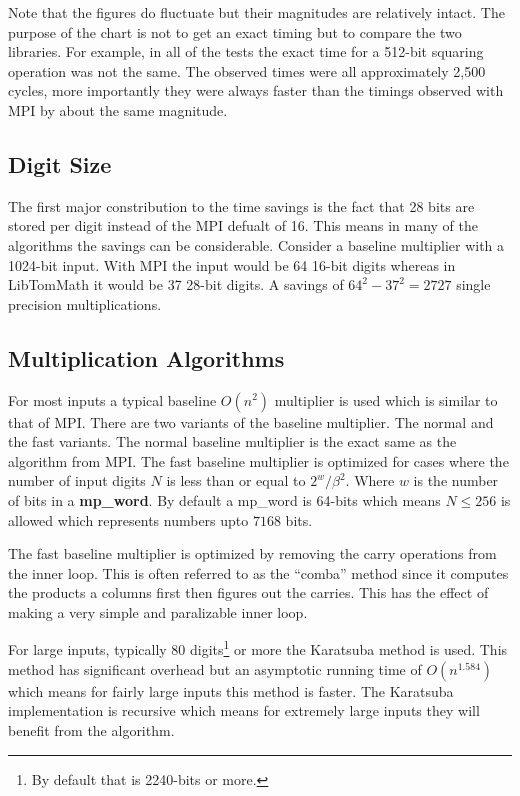 \documentclass{article}
\begin{document}
Note that the figures do fluctuate but their magnitudes are relatively intact.  The purpose of the chart is not to
get an exact timing but to compare the two libraries.  For example, in all of the tests the exact time for a 512-bit
squaring operation was not the same.  The observed times were all approximately 2,500 cycles, more importantly they
were always faster than the timings observed with MPI by about the same magnitude.  

\subsection{Digit Size}
The first major constribution to the time savings is the fact that 28 bits are stored per digit instead of the MPI 
defualt of 16.  This means in many of the algorithms the savings can be considerable.  Consider a baseline multiplier 
with a 1024-bit input.  With MPI the input would be 64 16-bit digits whereas in LibTomMath it would be 37 28-bit digits.
A savings of $64^2 - 37^2 = 2727$ single precision multiplications.  

\subsection{Multiplication Algorithms}
For most inputs a typical baseline $O(n^2)$ multiplier is used which is similar to that of MPI.  There are two variants 
of the baseline multiplier.  The normal and the fast variants.  The normal baseline multiplier is the exact same as the
algorithm from MPI.  The fast baseline multiplier is optimized for cases where the number of input digits $N$ is less
than or equal to $2^{w}/\beta^2$.  Where $w$ is the number of bits in a \textbf{mp\_word}.  By default a mp\_word is
64-bits which means $N \le 256$ is allowed which represents numbers upto $7168$ bits.

The fast baseline multiplier is optimized by removing the carry operations from the inner loop.  This is often referred
to as the ``comba'' method since it computes the products a columns first then figures out the carries.  This has the
effect of making a very simple and paralizable inner loop.

For large inputs, typically 80 digits\footnote{By default that is 2240-bits or more.} or more the Karatsuba method is 
used.  This method has significant overhead but an asymptotic running time of $O(n^{1.584})$ which means for fairly large
inputs this method is faster.  The Karatsuba implementation is recursive which means for extremely large inputs they
will benefit from the algorithm.
\end{document}
